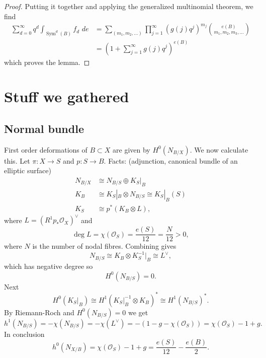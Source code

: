 \documentclass{amsart}
\theoremstyle{definition}
\renewcommand{\O}{\mathcal{O}}
\newcommand{\Sym}{\operatorname{Sym}}
\begin{document}
\begin{proof}
Putting it together and applying the generalized multinomial theorem,
we find
\begin{align*}
\sum _{d=0}^{\infty } q^d \int _{\Sym ^{d} (B)}f_{d}\,\,de & = \sum _{(m_{1},m_{2},\dots )} \prod _{j=1}^{\infty } \left(g (j) q^{j} \right)^{m_{j}} \binom{e (B)}{m_{1},m_{2},m_{3},\dots }\\
&=\left(1+\sum _{j=1}^{\infty }g (j) q^{j} \right)^{e (B)}
\end{align*}
which proves the lemma.   
\end{proof}

\newpage

\section{Stuff we gathered}

\subsection{Normal bundle} First order deformations of $B \subset X$ are given by $H^0(N_{B/X})$. We now calculate this. Let $\pi : X \rightarrow S$ and $p : S \rightarrow B$. Facts: (adjunction, canonical bundle of an elliptic surface)
\begin{align*}
N_{B/X} &\cong N_{B/S} \oplus K_{S}|_{B} \\
K_{B} &\cong K_{S}|_{B} \otimes N_{B/S} \cong K_{S}|_{B}(S) \\
K_S &\cong p^*(K_B \otimes L),
\end{align*}
where $L = (R^1 p_* \O_X)^{\vee}$ and 
\[
\deg L = \chi(\O_S) = \frac{e(S)}{12} = \frac{N}{12} > 0,
\]
where $N$ is the number of nodal fibres. Combining gives
\[
N_{B/S} \cong K_{B} \otimes K_{S}^{-1}|_{B} \cong L^\vee,
\] 
which has negative degree so 
\[
H^0(N_{B/S}) = 0.
\]     
Next
\[
H^0(K_S|_B) \cong H^1(K_S|_{B}^{-1} \otimes K_B)^* \cong H^1(N_{B/S})^*.
\]     
By Riemann-Roch and $H^0(N_{B/S}) = 0$ we get
\[
h^1(N_{B/S}) = -\chi(N_{B/S}) = - \chi(L^\vee)= -(1-g - \chi(\O_S)) = \chi(\O_S) - 1+g.
\]     
In conclusion
\[
h^0(N_{X/B}) = \chi(\O_S) - 1+g = \frac{e(S)}{12} - \frac{e(B)}{2}.
\]     
\end{document}
